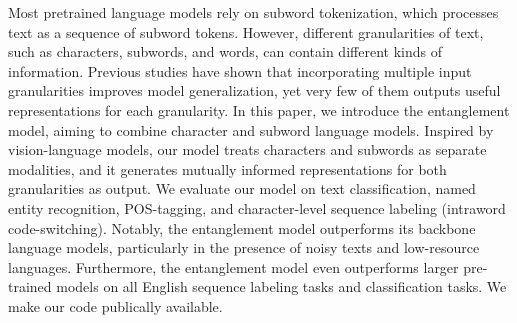 Most pretrained language models rely on subword tokenization, which processes text as a sequence of subword tokens. However, different granularities of text, such as characters, subwords, and words, can contain different kinds of information. Previous studies have shown that incorporating multiple input granularities improves model generalization, yet very few of them outputs useful representations for each granularity. In this paper, we introduce the entanglement model, aiming to combine character and subword language models. Inspired by vision-language models, our model treats characters and subwords as separate modalities, and it generates mutually informed representations for both granularities as output. We evaluate our model on text classification, named entity recognition,  POS-tagging, and character-level sequence labeling (intraword code-switching). Notably, the entanglement model outperforms its backbone language models, particularly in the presence of noisy texts and low-resource languages. Furthermore, the entanglement model even outperforms larger pre-trained models on all English sequence labeling tasks and classification tasks. We make our code publically available.
